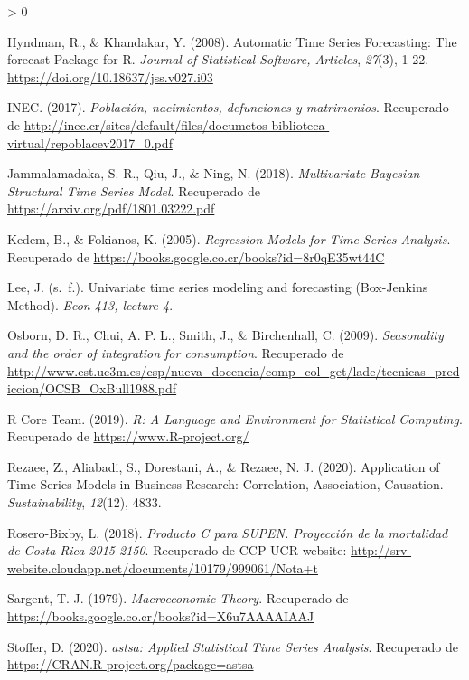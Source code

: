 \documentclass[
]{article}
\newlength{\cslhangindent}
\newenvironment{CSLReferences}[2] %
 {%
  \setlength{\parindent}{0pt}
  \ifodd #1 \everypar{\setlength{\hangindent}{\cslhangindent}}\ignorespaces\fi
  \ifnum #2 > 0
  \setlength{\parskip}{#2\baselineskip}
  \fi
 }%
 {}
\begin{document}
\begin{CSLReferences}{1}{0}
\leavevmode\hypertarget{ref-auto.arima}{}%
Hyndman, R., \& Khandakar, Y. (2008). Automatic Time Series Forecasting:
The forecast Package for R. \emph{Journal of Statistical Software,
Articles}, \emph{27}(3), 1-22.
\url{https://doi.org/10.18637/jss.v027.i03}

\leavevmode\hypertarget{ref-calidad_vitales}{}%
INEC. (2017). \emph{Población, nacimientos, defunciones y matrimonios}.
Recuperado de
\url{http://inec.cr/sites/default/files/documetos-biblioteca-virtual/repoblacev2017_0.pdf}

\leavevmode\hypertarget{ref-bayes}{}%
Jammalamadaka, S. R., Qiu, J., \& Ning, N. (2018). \emph{Multivariate
Bayesian Structural Time Series Model}. Recuperado de
\url{https://arxiv.org/pdf/1801.03222.pdf}

\leavevmode\hypertarget{ref-kedem}{}%
Kedem, B., \& Fokianos, K. (2005). \emph{Regression Models for Time
Series Analysis}. Recuperado de
\url{https://books.google.co.cr/books?id=8r0qE35wt44C}

\leavevmode\hypertarget{ref-Lee}{}%
Lee, J. (s.~f.). Univariate time series modeling and forecasting
(Box-Jenkins Method). \emph{Econ 413, lecture 4}.

\leavevmode\hypertarget{ref-Osborn2009SEASONALITYAT}{}%
Osborn, D. R., Chui, A. P. L., Smith, J., \& Birchenhall, C. (2009).
\emph{Seasonality and the order of integration for consumption}.
Recuperado de
\url{http://www.est.uc3m.es/esp/nueva_docencia/comp_col_get/lade/tecnicas_prediccion/OCSB_OxBull1988.pdf}

\leavevmode\hypertarget{ref-parallel}{}%
R Core Team. (2019). \emph{R: A Language and Environment for Statistical
Computing}. Recuperado de \url{https://www.R-project.org/}

\leavevmode\hypertarget{ref-tsa_decision_making}{}%
Rezaee, Z., Aliabadi, S., Dorestani, A., \& Rezaee, N. J. (2020).
Application of Time Series Models in Business Research: Correlation,
Association, Causation. \emph{Sustainability}, \emph{12}(12), 4833.

\leavevmode\hypertarget{ref-supenprodc}{}%
Rosero-Bixby, L. (2018). \emph{Producto C para SUPEN. Proyección de la
mortalidad de Costa Rica 2015-2150}. Recuperado de CCP-UCR website:
\url{http://srv-website.cloudapp.net/documents/10179/999061/Nota+t}

\leavevmode\hypertarget{ref-sargent_macro}{}%
Sargent, T. J. (1979). \emph{Macroeconomic Theory}. Recuperado de
\url{https://books.google.co.cr/books?id=X6u7AAAAIAAJ}

\leavevmode\hypertarget{ref-astsa}{}%
Stoffer, D. (2020). \emph{astsa: Applied Statistical Time Series
Analysis}. Recuperado de \url{https://CRAN.R-project.org/package=astsa}


\end{CSLReferences}
\end{document}
